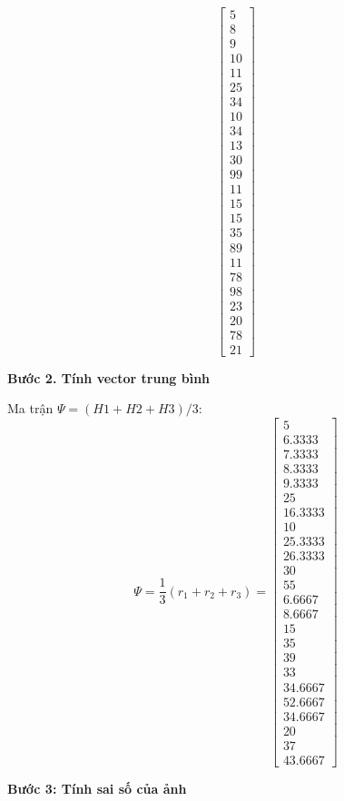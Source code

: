 \[\begin{bmatrix}
5 \\ 8 \\ 9 \\ 10 \\ 11 \\ 25 \\ 34 \\ 10 \\ 34 \\ 13 \\ 30 \\ 99 \\ 11 \\ 15 \\ 15 \\ 35 \\ 89 \\ 11 \\ 78 \\ 98 \\ 23 \\ 20 \\ 78 \\ 21
\end{bmatrix}
\]

\textbf{Bước 2. Tính vector trung bình}

Ma trận $\Psi = (H1 + H2 + H3)/3$:
\[
\Psi = \frac{1}{3}(r_1 + r_2 + r_3) = \begin{bmatrix}
5 \\
6.3333 \\
7.3333 \\
8.3333 \\
9.3333 \\
25 \\
16.3333 \\
10 \\
25.3333 \\
26.3333 \\
30 \\
55 \\
6.6667 \\
8.6667 \\
15 \\
35 \\
39 \\
33 \\
34.6667 \\
52.6667 \\
34.6667 \\
20 \\
37 \\
43.6667
\end{bmatrix}
\]

\textbf{Bước 3: Tính sai số của ảnh}


